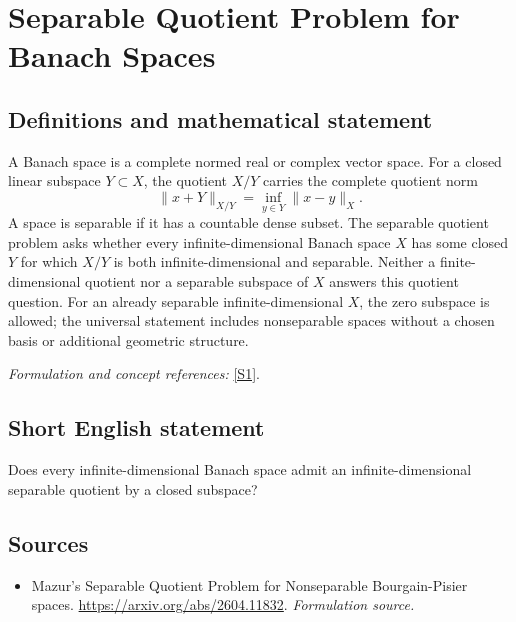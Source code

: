 \documentclass[11pt]{article}
\begin{document}
\section*{\texorpdfstring{Separable Quotient Problem for Banach Spaces}{Separable Quotient Problem for Banach Spaces}}\label{statement}
\subsection{Definitions and mathematical statement}
A Banach space is a complete normed real or complex vector space. For a closed linear subspace $Y\subset X$, the quotient $X/Y$ carries the complete quotient norm
\[
 \|x+Y\|_{X/Y}=\inf_{y\in Y}\|x-y\|_X.
\]
A space is separable if it has a countable dense subset. The separable quotient problem asks whether every infinite-dimensional Banach space $X$ has some closed $Y$ for which $X/Y$ is both infinite-dimensional and separable. Neither a finite-dimensional quotient nor a separable subspace of $X$ answers this quotient question. For an already separable infinite-dimensional $X$, the zero subspace is allowed; the universal statement includes nonseparable spaces without a chosen basis or additional geometric structure.
\par\smallskip\textit{Formulation and concept references:} \href{https://arxiv.org/abs/2604.11832}{[S1]}.

\subsection{Short English statement}
Does every infinite-dimensional Banach space admit an infinite-dimensional separable quotient by a closed subspace?
\subsection{Sources}
\begin{itemize}
\item[S1]Mazur's Separable Quotient Problem for Nonseparable Bourgain-Pisier spaces.
\url{https://arxiv.org/abs/2604.11832}.
\textit{Formulation source.}
\end{itemize}
\end{document}
